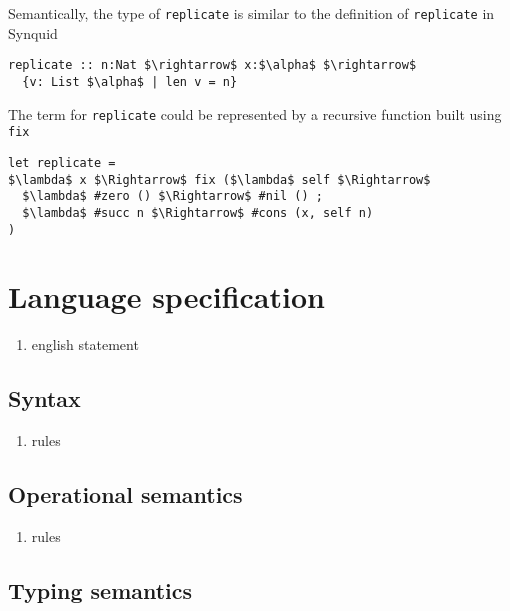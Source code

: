 \documentclass[sigplan,screen]{acmart}
\begin{document}
\hfill

\noindent Semantically, the type of \lstinline{replicate} is similar to the definition of 
\lstinline{replicate} in Synquid \cite{}    

\begin{lstlisting}[keywords={termination, measure, data, where}]
replicate :: n:Nat $\rightarrow$ x:$\alpha$ $\rightarrow$ 
  {v: List $\alpha$ | len v = n}

\end{lstlisting}

\hfill

\noindent The term for \lstinline{replicate} could be represented by a recursive function built using \lstinline{fix} 

\begin{lstlisting}[]
let replicate = 
$\lambda$ x $\Rightarrow$ fix ($\lambda$ self $\Rightarrow$
  $\lambda$ #zero () $\Rightarrow$ #nil () ;
  $\lambda$ #succ n $\Rightarrow$ #cons (x, self n)
) 
\end{lstlisting}


\section{Language specification}
\begin{enumerate}
  \item english statement 
\end{enumerate}
\subsection{Syntax}
\begin{enumerate}
  \item rules 
\end{enumerate}

\subsection{Operational semantics}
\begin{enumerate}
  \item rules 
\end{enumerate}

\subsection{Typing semantics}
\end{document}
